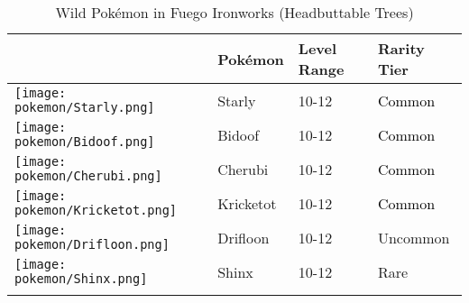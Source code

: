 \begin{longtable}{||l l l l||}%
\hline%
\rowcolor{GroundColor}%
&Pokémon&Level Range&Rarity Tier\\%
\hline%
\endhead%
\hline%
\rowcolor{GroundColor}%
\texttt{[image: pokemon/Starly.png]}&Starly&10{-}12&\textcolor{black}{%
Common%
}\\%
\hline%
\rowcolor{GroundColor}%
\texttt{[image: pokemon/Bidoof.png]}&Bidoof&10{-}12&\textcolor{black}{%
Common%
}\\%
\hline%
\rowcolor{GroundColor}%
\texttt{[image: pokemon/Cherubi.png]}&Cherubi&10{-}12&\textcolor{black}{%
Common%
}\\%
\hline%
\rowcolor{GroundColor}%
\texttt{[image: pokemon/Kricketot.png]}&Kricketot&10{-}12&\textcolor{black}{%
Common%
}\\%
\hline%
\rowcolor{GroundColor}%
\texttt{[image: pokemon/Drifloon.png]}&Drifloon&10{-}12&\textcolor{OliveGreen}{%
Uncommon%
}\\%
\hline%
\rowcolor{GroundColor}%
\texttt{[image: pokemon/Shinx.png]}&Shinx&10{-}12&\textcolor{RedOrange}{%
Rare%
}\\%
\hline%
\caption{Wild Pokémon in Fuego Ironworks (Headbuttable Trees)}%
\label{tab:FuegoIronworksHeadbuttableTrees}%
\end{longtable}